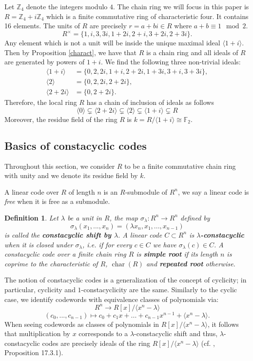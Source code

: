 \documentclass[a4paper, 12pt]{amsart}
\newtheorem{defn}[lemma]{Definition}
\theoremstyle{definition}
\newcommand{\F}{{\mathbb F}}
\newcommand{\Z}{{\mathbb Z}}
\newcommand{\id}[1]{\langle #1 \rangle}
\newcommand{\lm}{\lambda}
\DeclareMathOperator{\Char}{char}
\numberwithin{equation}{section}
\numberwithin{table}{section}
\begin{document}
Let $\mathbb Z_4$ denote the integers modulo $4$. The chain ring we will focus in this paper is $R =\Z_4+i\Z_4$ which is a finite commutative ring of characteristic four. It contains 16 elements.
The units of $R$ are precisely $r=a+bi \in R$ where $a+b \equiv 1 \mod 2$.
\[R^\times = \{1,i,3,3i,1+2i,2+i,3+2i,2+3i\}.\]
Any element which is not a unit will be inside the unique maximal ideal $\id{1+i}$. Then by Proposition \ref{charact}, we have that $R$ is a chain ring and all ideals of $R$ are generated by powers of $1+i$. We find the following three non-trivial ideals:
\begin{align*}
    \id{1+i} &= \{0,2,2i,1+i,2+2i,1+3i,3+i,3+3i\},\\
    \id{2} &= \{0,2,2i,2+2i\},\\
    \id{2+2i} &= \{0,2+2i\}.
\end{align*}
 Therefore, the local ring $R$ has a chain of inclusion of ideals as follows
\[ \langle0 \rangle \subsetneq \langle2+2i \rangle \subsetneq \langle 2 \rangle \subsetneq \langle 1+i \rangle \subsetneq R\]
Moreover, the residue field of the ring $R$ is $k =R/\id{1+i} \cong \F_2$.




\subsection{Basics of constacyclic codes}

Throughout this section, we consider $R$ to be a finite commutative chain ring with unity and we denote its residue field by $k$. 

A linear code over $R$ of length $n$ is an $R$-submodule of $R^n$, we say a linear code is \emph{free} when it is free as a submodule.

\begin{defn}
    Let $\lm$ be a unit in $R$, the map $\sigma_\lm : R^n \to R^n$ defined by
    \[\sigma_\lm(x_1,...,x_n) = (\lm x_n,x_1,...,x_{n-1})\]
    is called the \textbf{constacyclic shift by $\lm$}. A linear code $C \subset R^n$ is \textbf{$\lm$-constacyclic} when it is closed under $\sigma_\lm$, i.e. if for every $c \in C$ we have  $\sigma_\lm(c) \in C$. A constacyclic code over a finite chain ring $R$ is \textbf{simple root} if its length $n$ is coprime to the characteristic of $R$, $\Char(R)$ and \textbf{repeated root} otherwise.
\end{defn}

The notion of constacyclic codes is a generalization of the concept of cyclicity; in particular, cyclicity and $1$-constacyclicity are the same. Similarly to the cyclic case, we identify codewords with equivalence classes of polynomials via:
\[R^n \to R[x]/\id{x^n-\lm}\]
\[(c_0,...,c_{n-1}) \mapsto c_0+c_1x+...+c_{n-1}x^{n-1} + \id{x^n-\lm}.\]
When seeing codewords as classes of polynomials in $R[x]/\id{x^n-\lm}$, it follows that multiplication by $x$ corresponds to a $\lm$-constacyclic shift and thus, $\lm$-constacyclic codes are precisely ideals of the ring $R[x]/\id{x^n-\lm}$ (cf. \cite{book}, Proposition 17.3.1).
\end{document}
